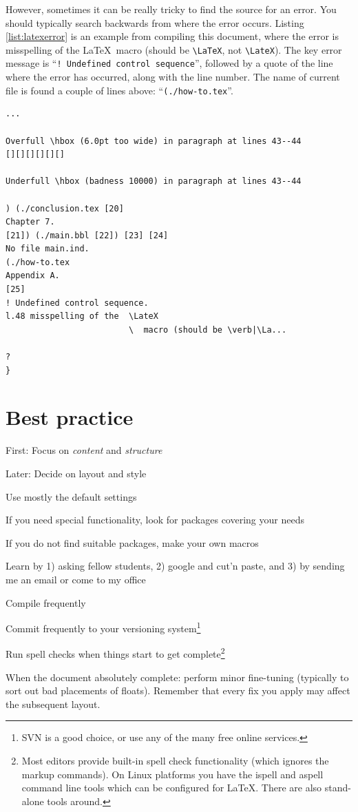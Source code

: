 However, sometimes it can be really tricky to find the source for an error. You should typically search backwards from where the error occurs. Listing \ref{list:latexerror} is an example from compiling this document, where the error is 
misspelling of the \LaTeX\  macro (should be \verb|\LaTeX|, not \verb|\LateX|). The key error message is ``\verb|! Undefined control sequence|'', followed by a quote of the line where the error has occurred, along with the line number. The name of current file is found a couple of lines above: ``\verb|(./how-to.tex|''.

\begin{lstlisting}[float=htpb, caption=\LaTeX\ error output,label=list:latexerror]
...

Overfull \hbox (6.0pt too wide) in paragraph at lines 43--44
[][][][][][]

Underfull \hbox (badness 10000) in paragraph at lines 43--44

) (./conclusion.tex [20]
Chapter 7.
[21]) (./main.bbl [22]) [23] [24]
No file main.ind.
(./how-to.tex
Appendix A.
[25]
! Undefined control sequence.
l.48 misspelling of the  \LateX
                         \  macro (should be \verb|\La...

? 
} 
\end{lstlisting} 



\section{Best practice}
\label{sec:bestpractise}

\begin{compactitem}
\item First: Focus on {\em content} and {\em structure} 
\item Later: Decide on layout and style
\item Use mostly the default settings
\item If you need special functionality, look for packages covering your needs
\item If you do not find suitable packages, make your own macros
\item Learn by 1) asking fellow students, 2) google and cut'n paste, and 3) by sending me an email or come to my office
\item Compile frequently
\item Commit frequently to your versioning system\footnote{SVN is a good choice, or use any of the many free online services.}
\item Run spell checks when things start to get complete\footnote{Most editors provide built-in spell check functionality (which ignores the markup commands).  On Linux platforms you have the ispell and aspell command line tools which can be configured for \LaTeX. There are also stand-alone tools around.}
\item When the document absolutely complete: perform minor fine-tuning (typically to sort out bad placements of floats). Remember that every fix you apply may affect the subsequent layout.
\end{compactitem}




